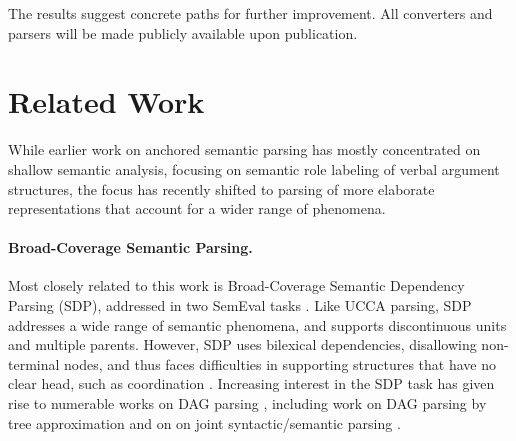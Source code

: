 \documentclass[11pt]{article}
\begin{document}
The results suggest concrete paths for further improvement.
All converters and parsers will be made publicly available upon publication.



\section{Related Work}\label{sec:related_work}
While earlier work on anchored semantic parsing has mostly concentrated on shallow semantic analysis,
focusing on semantic role labeling of verbal argument structures,
the focus has recently shifted to parsing of more elaborate representations that account
for a wider range of phenomena.


\paragraph{Broad-Coverage Semantic Parsing.}
Most closely related to this work is Broad-Coverage Semantic Dependency Parsing (SDP),
addressed in two SemEval tasks \cite{oepen2014semeval,oepen2015semeval}.
Like UCCA parsing, SDP addresses a wide range of semantic phenomena,
and supports discontinuous units and multiple parents. However, SDP uses
bilexical dependencies, disallowing non-terminal nodes, and thus faces difficulties in supporting
structures that have no clear head, such as coordination \cite{Ivanova2012who}.
Increasing interest in the SDP task has given rise to numerable works on DAG parsing
\cite{ribeyre-villemontedelaclergerie-seddah:2014:SemEval,thomson-EtAl:2014:SemEval,almeida-martins:2015:SemEval,du-EtAl:2015:SemEval}, including work on DAG parsing by tree approximation
\cite{agic-koller:2014:SemEval,schluter-EtAl:2014:SemEval}
and on on joint syntactic/semantic parsing
\cite{henderson2013multilingual,swayamdipta-EtAl:2016:CoNLL}.
\end{document}
